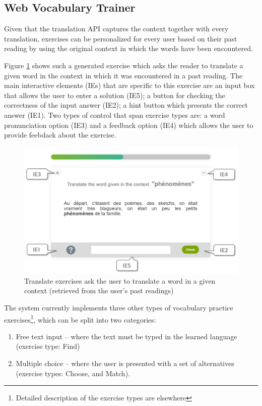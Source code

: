 
\newpage
\subsection{Web Vocabulary Trainer}

Given that the translation API captures the context together with every translation, exercises can be personalized for every user based on their past reading by using the original context in which the words have been encountered.

Figure \ref{fig:exercise_translate} shows such a generated exercise which asks the reader to translate a given word in the context in which it was encountered in a past reading. The main interactive elements (IEs) that are specific to this exercise are an input box that allows the user to enter a solution (IE5); a button for checking the correctness of the input answer (IE2); a hint button which presents the correct answer (IE1). Two types of control that span exercise types are: a word pronunciation option (IE3) and a feedback option (IE4) which allows the user to provide feebdack about the exercise.

\begin{figure}[h!]
\centering
  \includegraphics[width=0.9\columnwidth]{figures/exercise_translate}
  \caption{Translate exercises ask the user to translate a word in a given context (retrieved from the user's past readings)}
  \label{fig:exercise_translate}
\end{figure}

The system currently implements three other types of vocabulary practice exercises\footnote{Detailed description of the exercise types are elsewhere\cite{Avagyan17a-blocks}}, which can be split into two categories: 
\begin{enumerate}
	
	\item Free text input -- where the text must be typed in the learned language (exercise type: Find)

	\item Multiple choice -- where the user is presented with a set of alternatives (exercise types: Choose, and Match). 

\end{enumerate}

